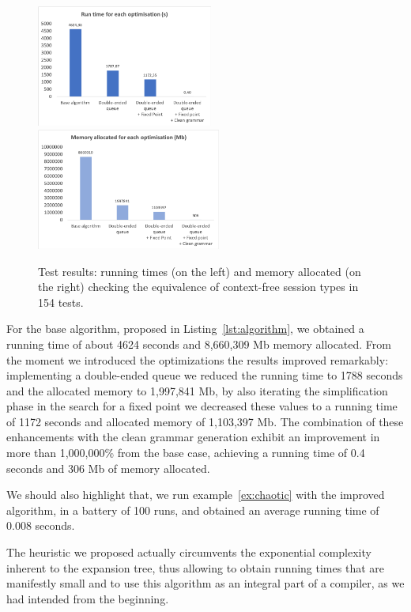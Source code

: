 \begin{figure}[h]
	\includegraphics[height=4cm]{img/run_time}	\hspace*{2mm}
	\includegraphics[height=4cm]{img/memory_alloc}
	\caption{Test results: running times (on the left) and
	memory allocated (on the right) checking the equivalence
	of context-free session types in 154 tests.}
	\label{fig:results}
\end{figure}

For the base algorithm, proposed in Listing~\ref{lst:algorithm}, we
obtained a running time of about 4624 seconds and
8,660,309 Mb memory allocated. From the moment we introduced the
optimizations the results improved remarkably: 
implementing a double-ended queue we reduced the running time to 1788 
seconds and the allocated memory to 1,997,841 Mb, by also
iterating the
simplification phase in the search for a fixed point we decreased these values
to a running time of 1172 seconds and 
allocated memory of 1,103,397 Mb. The 
combination of these enhancements with the clean grammar generation
exhibit an improvement in more than 1,000,000\% from the base case,
achieving a running time of 0.4 seconds and 306 Mb 
of memory allocated.


We should also highlight that, we run example~\eqref{ex:chaotic}
with the improved algorithm, in a battery of 100 runs, and obtained an
average running time of 0.008 seconds.

The heuristic we proposed actually circumvents the exponential complexity 
inherent to the expansion tree, thus allowing to obtain running times that 
are manifestly small and to use this algorithm as an integral 
part of a compiler, as we had intended from the beginning. 
%


